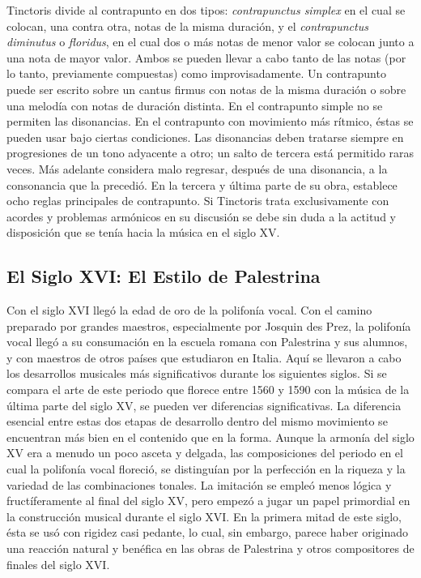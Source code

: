 \documentclass[letterpaper,12pt]{book}
\theoremstyle{definition} \newtheorem{Def}{Definición}[chapter]
\theoremstyle{definition} \newtheorem{Teo}{Teorema}[chapter]
\theoremstyle{definition} \newtheorem{Pro}{Proposición}[chapter]
\theoremstyle{definition} \newtheorem{Lema}{Lema}[chapter]
\begin{document}
Tinctoris divide al contrapunto en dos tipos: \emph{contrapunctus simplex} en el cual se colocan, una contra otra, notas de la misma duración, y el  \emph{contrapunctus diminutus} o \emph{floridus}, en el cual dos o más notas de menor valor se colocan junto a una nota de mayor valor. Ambos se pueden llevar a cabo tanto de las notas (por lo tanto, previamente compuestas) como improvisadamente. Un contrapunto puede ser escrito sobre un cantus firmus con notas de la misma duración o sobre una melodía con notas de duración distinta. En el contrapunto simple no se permiten las disonancias. En el contrapunto con movimiento más rítmico, éstas se pueden usar bajo ciertas condiciones. Las disonancias deben tratarse siempre en progresiones de un tono adyacente a otro; un salto de tercera está permitido raras veces. Más adelante considera malo regresar, después de una disonancia, a la consonancia que la precedió. 
En la tercera y última parte de su obra, establece ocho reglas principales de contrapunto.
Si Tinctoris trata exclusivamente con acordes y problemas armónicos en su discusión se debe sin duda a la actitud y disposición que se tenía hacia la música en el siglo XV. 

\subsection{El Siglo XVI: El Estilo de Palestrina}

Con el siglo XVI llegó la edad de oro de la polifonía vocal. Con el camino preparado por grandes maestros, especialmente por Josquin des Prez, la polifonía vocal llegó a su consumación en la escuela romana con Palestrina y sus alumnos, y con maestros de otros países que estudiaron en Italia. Aquí se llevaron a cabo los desarrollos musicales más significativos durante los siguientes siglos. Si se compara el arte de este periodo que florece entre 1560 y 1590 con la música de la última parte del siglo XV, se pueden ver diferencias significativas. La diferencia esencial entre estas dos etapas de desarrollo dentro del mismo movimiento se encuentran más bien en el contenido que en la forma. Aunque la armonía del siglo XV era a menudo un poco asceta y delgada, las composiciones del periodo en el cual la polifonía vocal floreció, se distinguían por la perfección en la riqueza y la variedad de las combinaciones tonales. La imitación se empleó menos lógica y fructíferamente al final del siglo XV, pero empezó a jugar un papel primordial en la construcción musical durante el siglo XVI. En la primera mitad de este siglo, ésta se usó con rigidez casi pedante, lo cual, sin embargo, parece haber originado una reacción natural y benéfica en las obras de Palestrina y otros compositores de finales del siglo XVI. 
\end{document}
